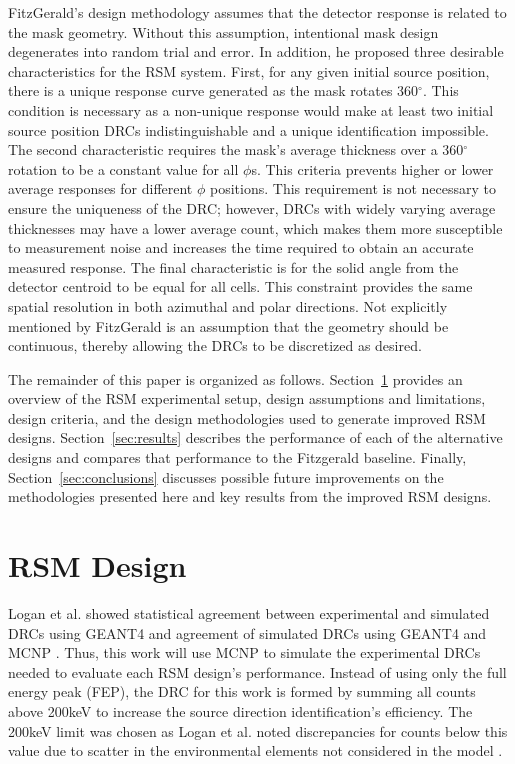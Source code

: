 \documentclass[3p,times]{elsarticle}
\begin{document}
FitzGerald's design methodology assumes that the detector response is related to the mask geometry.  
Without this assumption, intentional mask design degenerates into random trial and error.
In addition, he proposed three desirable characteristics for the RSM system.  
First, for any given initial source position, there is a unique response curve generated as the mask rotates 360$^\circ$.  
This condition is necessary as a non-unique response would make at least two initial source position DRCs indistinguishable and a unique identification impossible.
The second characteristic requires the mask's average thickness over a 360$^\circ$ rotation to be a constant value for all $\phi$s.  
This criteria prevents higher or lower average responses for different $\phi$ positions. 
This requirement is not necessary to ensure the uniqueness of the DRC; however, DRCs with widely varying average thicknesses may have a lower average count, which makes them more susceptible to measurement noise and increases the time required to obtain an accurate measured response.
The final characteristic is for the solid angle from the detector centroid to be equal for all cells.  
This constraint provides the same spatial resolution in both azimuthal and polar directions.
Not explicitly mentioned by FitzGerald is an assumption that the geometry should be continuous, thereby allowing the DRCs to be discretized as desired.

The remainder of this paper is organized as follows.
Section~\ref{sec:rsm-design} provides an overview of the RSM experimental setup, design assumptions and limitations, design criteria, and the design methodologies used to generate improved RSM designs. 
Section~\ref{sec:results} describes the performance of each of the alternative designs and compares that performance to the Fitzgerald baseline.  
Finally, Section~\ref{sec:conclusions} discusses possible future improvements on the methodologies presented here and key results from the improved RSM designs. 

\section{RSM Design} \label{sec:rsm-design}
Logan et al.\cite{Logan2017} showed statistical agreement between experimental and simulated DRCs using GEANT4 \cite{Agostinelli03} and agreement of simulated DRCs using GEANT4 and MCNP \cite{Goorley13}.
Thus, this work will use MCNP to simulate the experimental DRCs needed to evaluate each RSM design's performance.  
Instead of using only the full energy peak (FEP), the DRC for this work is formed by summing all counts above 200keV to increase the source direction identification's efficiency.  
The 200keV limit was chosen as Logan et al. noted discrepancies for counts below this value due to scatter in the environmental elements not considered in the model \cite{Logan2017}.
\end{document}
